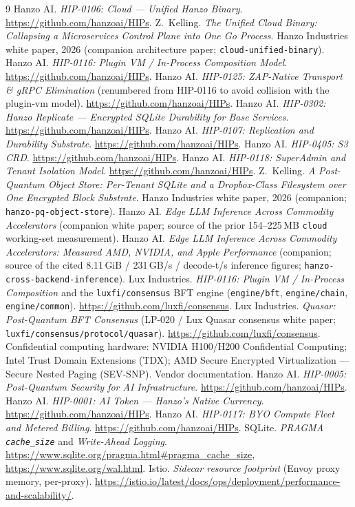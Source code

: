 \documentclass[11pt]{article}
\begin{document}
\begin{thebibliography}{9}
 Hanzo AI. \emph{HIP-0106: Cloud --- Unified Hanzo Binary}.
\url{https://github.com/hanzoai/HIPs}.
 Z.~Kelling. \emph{The Unified Cloud Binary: Collapsing a Microservices
Control Plane into One Go Process}. Hanzo Industries white paper, 2026 (companion architecture
paper; \texttt{cloud-unified-binary}).
 Hanzo AI. \emph{HIP-0116: Plugin VM / In-Process Composition Model}.
\url{https://github.com/hanzoai/HIPs}.
 Hanzo AI. \emph{HIP-0125: ZAP-Native Transport \& gRPC Elimination} (renumbered
from HIP-0116 to avoid collision with the plugin-vm model).
\url{https://github.com/hanzoai/HIPs}.
 Hanzo AI. \emph{HIP-0302: Hanzo Replicate --- Encrypted SQLite Durability for
Base Services}. \url{https://github.com/hanzoai/HIPs}.
 Hanzo AI. \emph{HIP-0107: Replication and Durability Substrate}.
\url{https://github.com/hanzoai/HIPs}.
 Hanzo AI. \emph{HIP-0405: S3 CRD}.
\url{https://github.com/hanzoai/HIPs}.
 Hanzo AI. \emph{HIP-0118: SuperAdmin and Tenant Isolation Model}.
\url{https://github.com/hanzoai/HIPs}.
 Z.~Kelling. \emph{A Post-Quantum Object Store: Per-Tenant SQLite and a
Dropbox-Class Filesystem over One Encrypted Block Substrate}. Hanzo Industries white paper, 2026
(companion; \texttt{hanzo-pq-object-store}).
 Hanzo AI. \emph{Edge LLM Inference Across Commodity Accelerators} (companion
white paper; source of the prior 154--225\,MB \texttt{cloud} working-set measurement).
 Hanzo AI. \emph{Edge LLM Inference Across Commodity Accelerators: Measured AMD,
NVIDIA, and Apple Performance} (companion; source of the cited 8.11\,GiB / 231\,GB/s / decode-t/s
inference figures; \texttt{hanzo-cross-backend-inference}).
 Lux Industries. \emph{HIP-0116: Plugin VM / In-Process Composition} and the
\texttt{luxfi/consensus} BFT engine (\texttt{engine/bft}, \texttt{engine/chain},
\texttt{engine/common}). \url{https://github.com/luxfi/consensus}.
 Lux Industries. \emph{Quasar: Post-Quantum BFT Consensus} (LP-020 / Lux Quasar
consensus white paper; \texttt{luxfi/consensus/protocol/quasar}).
\url{https://github.com/luxfi/consensus}.
 Confidential computing hardware: NVIDIA H100/H200 Confidential Computing; Intel Trust
Domain Extensions (TDX); AMD Secure Encrypted Virtualization --- Secure Nested Paging (SEV-SNP).
Vendor documentation.
 Hanzo AI. \emph{HIP-0005: Post-Quantum Security for AI Infrastructure}.
\url{https://github.com/hanzoai/HIPs}.
 Hanzo AI. \emph{HIP-0001: AI Token --- Hanzo's Native Currency}.
\url{https://github.com/hanzoai/HIPs}.
 Hanzo AI. \emph{HIP-0117: BYO Compute Fleet and Metered Billing}.
\url{https://github.com/hanzoai/HIPs}.
 SQLite. \emph{PRAGMA \texttt{cache\_size}} and \emph{Write-Ahead Logging}.
\url{https://www.sqlite.org/pragma.html#pragma_cache_size}, \url{https://www.sqlite.org/wal.html}.
 Istio. \emph{Sidecar resource footprint} (Envoy proxy memory, per-proxy).
\url{https://istio.io/latest/docs/ops/deployment/performance-and-scalability/}.
\end{thebibliography}
\end{document}
